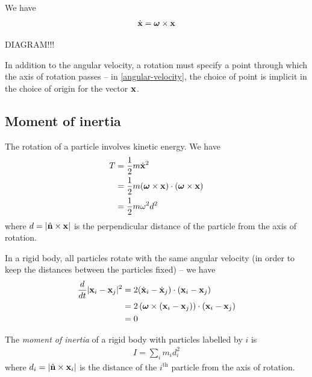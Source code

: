 \documentclass{../../template/note}
\begin{document}
    \begin{proposition}
        \label{angular-velocity} We have
        \begin{align*}
            \dot{\V x} = \V \omega \times \V x
        \end{align*}
    \end{proposition}
    
    DIAGRAM!!!

    In addition to the angular velocity, a rotation must specify a point through which the axis of rotation passes -- in \cref{angular-velocity}, the choice of point is implicit in the choice of origin for the vector \(\V x\).


    \subsection{Moment of inertia}

    The rotation of a particle involves kinetic energy. We have
    \begin{align*}
        T &= \frac 1 2 m \dot{\V x}^2 \\
        &= \frac 1 2 m (\V \omega \times \V x) \cdot (\V \omega \times \V x) \\
        &= \frac 1 2 m \omega^2 d^2
    \end{align*}
    where \(d = |\hvec n \times \V x|\) is the perpendicular distance of the particle from the axis of rotation.

    In a rigid body, all particles rotate with the same angular velocity (in order to keep the distances between the particles fixed) -- we have
    \begin{align*}
        \frac d {dt} |\V x_i - \V x_j|^2 &= 2(\dot{\V x}_i - \dot{\V x}_j) \cdot (\V x_i - \V x_j) \\
        &= 2\left(\V \omega \times (\V x_i - \V x_j)\right) \cdot (\V x_i - \V x_j) \\
        &= 0
    \end{align*}

    \begin{definition}
        The \emph{moment of inertia} of a rigid body with particles labelled by \(i\) is
        \begin{align*}
            I = \sum_i m_i d_i^2
        \end{align*}
        where \(d_i = |\hvec n \times \V x_i|\) is the distance of the \(i^\text{th}\) particle from the axis of rotation.        
    \end{definition}
    
\end{document}
